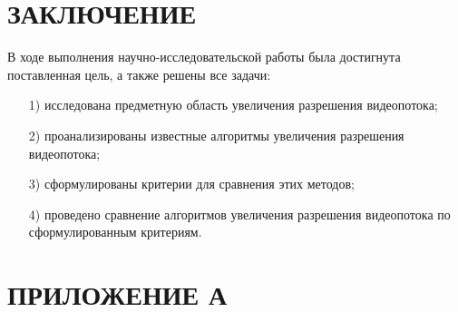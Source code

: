 \documentclass{bmstu}
\begin{document}
{\centering \chapter*{ЗАКЛЮЧЕНИЕ}}

В ходе выполнения научно-исследовательской работы была достигнута поставленная цель, а также решены все задачи:
\begin{enumerate}
\item[1)] исследована предметную область увеличения разрешения видеопотока;
\item[2)] проанализированы известные алгоритмы увеличения разрешения видеопотока;
\item[3)] сформулированы критерии для сравнения этих методов;
\item[4)] проведено сравнение алгоритмов увеличения разрешения видеопотока по сформулированным критериям.
\end{enumerate}

{\centering {\center\printbibliography[title=СПИСОК ИСПОЛЬЗОВАННЫХ ИСТОЧНИКОВ]}}

{\centering \chapter*{ПРИЛОЖЕНИЕ А}}
\end{document}
